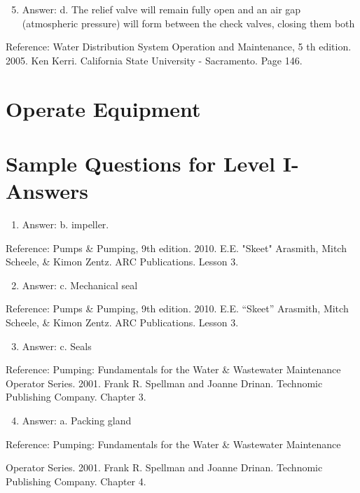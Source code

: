 \documentclass[10pt]{article}
\begin{document}
\begin{enumerate}
  \setcounter{enumi}{4}
  \item Answer: d. The relief valve will remain fully open and an air gap (atmospheric pressure) will form between the check valves, closing them both
\end{enumerate}

Reference: Water Distribution System Operation and Maintenance, 5 th edition. 2005. Ken Kerri. California State University - Sacramento. Page 146.

\section{Operate Equipment}
\section{Sample Questions for Level I-Answers}
\begin{enumerate}
  \item Answer: b. impeller.
\end{enumerate}

Reference: Pumps \& Pumping, 9th edition. 2010. E.E. "Skeet" Arasmith, Mitch Scheele, \& Kimon Zentz. ARC Publications. Lesson 3.

\begin{enumerate}
  \setcounter{enumi}{1}
  \item Answer: c. Mechanical seal
\end{enumerate}

Reference: Pumps \& Pumping, 9th edition. 2010. E.E. “Skeet” Arasmith, Mitch Scheele, \& Kimon Zentz. ARC Publications. Lesson 3.

\begin{enumerate}
  \setcounter{enumi}{2}
  \item Answer: c. Seals
\end{enumerate}

Reference: Pumping: Fundamentals for the Water \& Wastewater Maintenance Operator Series. 2001. Frank R. Spellman and Joanne Drinan. Technomic Publishing Company. Chapter 3.

\begin{enumerate}
  \setcounter{enumi}{3}
  \item Answer: a. Packing gland
\end{enumerate}

Reference: Pumping: Fundamentals for the Water \& Wastewater Maintenance

Operator Series. 2001. Frank R. Spellman and Joanne Drinan. Technomic Publishing Company. Chapter 4.
\end{document}
